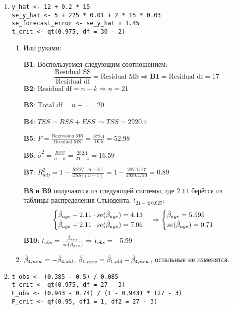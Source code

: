 \documentclass[12pt, a4paper]{article}
\theoremstyle{definition}
\begin{document}
\begin{enumerate}

\item
\begin{verbatim}
y_hat <- 12 + 0.2 * 15
se_y_hat <- 5 + 225 * 0.01 + 2 * 15 * 0.03
se_forecast_error <- se_y_hat + 1.45
t_crit <- qt(0.975, df = 30 - 2)
\end{verbatim}

\begin{enumerate}
\item
Или руками:

\textbf{B1}: Воспользуемся следующим соотношением:
\[
\frac{\text{Residual SS}}{\text{Residual df}} = \text{Residual MS} \Rightarrow \textbf{B1} = \text{Residual df} = 17
\]
\textbf{B2}: $\text{Residual df} = n - k \Rightarrow n = 21$

\textbf{B3}: $\text{Total df} = n - 1 = 20$

\textbf{B4}: $TSS = RSS + ESS \Rightarrow TSS = 2920.4$

\textbf{B5}: $F = \frac{\text{Regression MS}}{\text{Residual MS}} = \frac{879.4}{16.6} = 52.98$

\textbf{B6}: $\hat{\sigma}^2 = \frac{RSS}{n-k} = \frac{282.1}{21-4} = 16.59$

\textbf{B7}: $R^2_{adj} = 1 - \frac{RSS/(n-k)}{TSS/(n-1)} = 1 - \frac{282.1/17}{2920.4/20} = 0.89$

\textbf{B8} и \textbf{B9} получаются из следующей системы, где $2.11$ берётся из таблицы распределения Стьюдента, $t_{21-4;0.025}$:
\[
\begin{cases}
\hat{\beta}_{age} - 2.11 \cdot se(\hat{\beta}_{age}) = 4.13 \\
\hat{\beta}_{age} + 2.11 \cdot se(\hat{\beta}_{age}) = 7.06
\end{cases}
\Rightarrow
\begin{cases}
\hat{\beta}_{age} = 5.595 \\
se(\hat{\beta}_{age}) = 0.71
\end{cases}
\]
\textbf{B10}: $t_{obs} = \frac{\hat{\beta}_{sex}}{se(\hat{\beta}_{sex})} \Rightarrow t_{obs} = -5.99$
\item $\hat{\beta}_{4, new} = -\hat{\beta}_{4, old}$, $\hat{\beta}_{1, new} = \hat{\beta}_{1, old} - \hat{\beta}_{4, new}$, остальные не изменятся.
\end{enumerate}
\item


\begin{verbatim}
t_obs <- (0.385 - 0.5) / 0.085
t_crit <- qt(0.975, df = 27 - 3)
F_obs <- (0.943 - 0.74) / (1 - 0.943) * (27 - 3)
F_crit <- qf(0.95, df1 = 1, df2 = 27 - 3)
\end{verbatim}


\end{enumerate}
\end{document}
